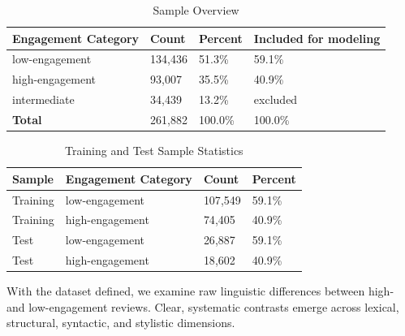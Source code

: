 \documentclass[12pt]{article}
\begin{document}
\begin{longtable}{llll}
\caption{Sample Overview} \\    
\textbf{Engagement Category} & \textbf{Count} & \textbf{Percent} & \textbf{Included for modeling} \\
\hline
low-engagement & 134{,}436 & 51.3\% & 59.1\% \\
high-engagement & 93{,}007 & 35.5\% & 40.9\% \\
intermediate & 34{,}439 & 13.2\% & excluded \\
\textbf{Total} & 261{,}882 & 100.0\% & 100.0\% \\
\end{longtable}

\begin{longtable}{llll}
\caption{Training and Test Sample Statistics} \\    
\textbf{Sample} & \textbf{Engagement Category} & \textbf{Count} & \textbf{Percent} \\
\hline
Training & low-engagement & 107{,}549 & 59.1\% \\
Training & high-engagement & 74{,}405 & 40.9\% \\
Test & low-engagement & 26{,}887 & 59.1\% \\
Test & high-engagement & 18{,}602 & 40.9\% \\
\end{longtable}

With the dataset defined, we examine raw linguistic differences between high- and low-engagement reviews. Clear, systematic contrasts emerge across lexical, structural, syntactic, and stylistic dimensions.
\end{document}
